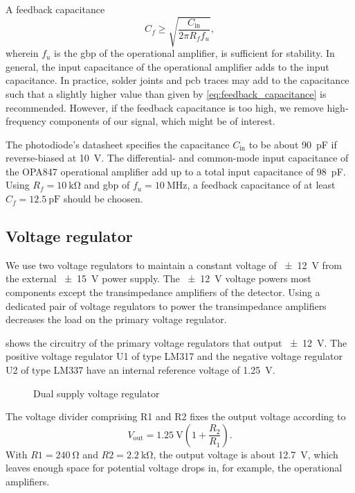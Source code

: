 A feedback capacitance
\begin{equation}
	C_f\geq\sqrt{\frac{C_\text{in}}{2\pi R_f f_u}},
	\label{eq:feedback_capacitance}
\end{equation}
wherein $f_u$ is the \gls{gbp} of the operational amplifier,
 is sufficient for stability.
 In general, the input capacitance of the operational amplifier adds to the input capacitance.
 In practice, solder joints and \gls{pcb} traces may add to the capacitance such that a slightly higher value than given by \eqref{eq:feedback_capacitance} is recommended.
 However, if the feedback capacitance is too high, we remove high-frequency components of our signal, which might be of interest.
 
The photodiode's datasheet specifies the capacitance $C_\text{in}$ to be about \SI{90}{\pico\farad} if reverse-biased at \SI{10}{\volt}.
The differential- and common-mode input capacitance of the OPA847 operational amplifier add up to a total input capacitance of \SI{98}{\pico\farad}.
Using $R_f=\SI{10}{\kilo\ohm}$ and \gls{gbp} of $f_u=\SI{10}{\mega\hertz}$, a feedback capacitance of at least $C_f=\SI{12.5}{\pico\farad}$ should be choosen.

\subsection{Voltage regulator}

We use two voltage regulators to maintain a constant voltage of \SI{\pm12}{\volt} from the external \SI{\pm15}{\volt} power supply. The \SI{\pm12}{\volt} voltage powers most components except the transimpedance amplifiers of the detector.
Using a dedicated pair of voltage regulators to power the transimpedance amplifiers decreases the load on the primary voltage regulator.

 shows the circuitry of the primary voltage regulators that output \SI{\pm12}{\volt}.
The positive voltage regulator U1 of type LM317 and the negative voltage regulator U2 of type LM337 have an internal reference voltage of \SI{1.25}{\volt}.

\begin{figure}[H]
	\centering
	
	\caption{Dual supply voltage regulator}\label{fig:voltage_regulator}
\end{figure}

The voltage divider comprising R1 and R2 fixes the output voltage according to
\begin{equation}
	V_\text{out}=\SI{1.25}{\volt}\left(1+\frac{R_2}{R_1}\right).
\end{equation}
With $R1 = \SI{240}{\ohm}$ and $R2 = \SI{2.2}{\kilo\ohm}$, the output voltage is about \SI{12.7}{\volt}, which leaves enough space for potential voltage drops in, for example, the operational amplifiers.

